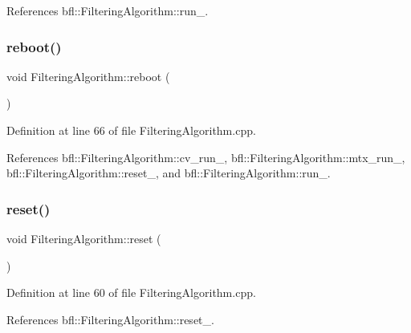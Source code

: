 References bfl\+::\+Filtering\+Algorithm\+::run\+\_\+.

\mbox{\label{classbfl_1_1FilteringAlgorithm_a6022859aa985474fb997343cc935b11e}} 
\subsubsection{\texorpdfstring{reboot()}{reboot()}}
{\footnotesize\ttfamily void Filtering\+Algorithm\+::reboot (\begin{DoxyParamCaption}{ }\end{DoxyParamCaption})\hspace{0.3cm}{\ttfamily [inherited]}}



Definition at line 66 of file Filtering\+Algorithm.\+cpp.



References bfl\+::\+Filtering\+Algorithm\+::cv\+\_\+run\+\_\+, bfl\+::\+Filtering\+Algorithm\+::mtx\+\_\+run\+\_\+, bfl\+::\+Filtering\+Algorithm\+::reset\+\_\+, and bfl\+::\+Filtering\+Algorithm\+::run\+\_\+.

\mbox{\label{classbfl_1_1FilteringAlgorithm_a2403c62fbd7bd7f5cda56a84f5f30331}} 
\subsubsection{\texorpdfstring{reset()}{reset()}}
{\footnotesize\ttfamily void Filtering\+Algorithm\+::reset (\begin{DoxyParamCaption}{ }\end{DoxyParamCaption})\hspace{0.3cm}{\ttfamily [inherited]}}



Definition at line 60 of file Filtering\+Algorithm.\+cpp.



References bfl\+::\+Filtering\+Algorithm\+::reset\+\_\+.

\mbox{\label{classbfl_1_1FilteringAlgorithm_a009cbe5f4bbb16967f6c6ddcaed8fbb1}} 
